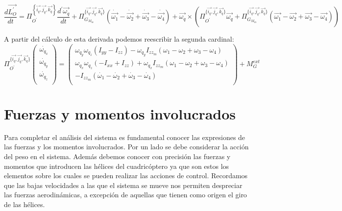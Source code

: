 \documentclass[main]{subfiles}
\begin{document}
{\footnotesize \begin{equation}
\frac{d\vec{L_O^\prime}}{dt}=\Pi_{O^\prime}^{\left\lbrace\vec{i_q}, \vec{j_q}, \vec{k_q}\right\rbrace}\frac{d^\prime\vec{{\omega}_q}}{dt}+\Pi_{G_{M_{m}}}^{\{\vec{i_q}, \vec{j_q}, \vec{k_q}\}}(\dot{\vec{\omega_1}}-\dot{\vec{\omega_2}}+\dot{\vec{\omega_3}}-\dot{\vec{\omega_4}})
+\vec{\omega_q}\times(\Pi_{O^\prime}^{\{\vec{i_q}, \vec{j_q}, \vec{k_q}\}}\vec{\omega_q}+\Pi_{G_{M_{m}}}^{\{\vec{i_q}, \vec{j_q}, \vec{k_q}\}}(\vec{\omega_1}-\vec{\omega_2}+\vec{\omega_3}-\vec{\omega_4}))
\end{equation}}

A partir del c\'alculo de esta derivada podemos reescribir la segunda cardinal:
\begin{equation}
 \Pi_{O^\prime}^{\{\vec{i_q}, \vec{j_q}, \vec{k_q}\}}\left(\begin{array}{c}
\dot{\omega_{q_x}}\\
\dot{\omega_{q_y}}\\
\dot{\omega_{q_z}}\\
\end{array}\right) = \left(\begin{array}{c}
\omega_{q_y}\omega_{q_z}(I_{yy}-I_{zz})-\omega_{q_y}I_{zz_m}(\omega_1-\omega_2+\omega_3-\omega_4)\\

\omega_{q_x}\omega_{q_z}(-I_{xx}+I_{zz})+\omega_{q_x}I_{zz_m}(\omega_1-\omega_2+\omega_3-\omega_4)\\

-I_{zz_m}(\dot{\omega_1}-\dot{\omega_2}+\dot{\omega_3}-\dot{\omega_4})\\

\end{array}\right) + M_G^{ext}
\label{eq:omegas}
\end{equation}

\section{Fuerzas y momentos involucrados}
\label{FYT}

Para completar el an\'alisis del sistema es fundamental conocer las expresiones de las fuerzas y los momentos involucrados. Por un lado se debe considerar la acci\'on del peso en el sistema. Adem\'as debemos conocer con precisi\'on las fuerzas y momentos que introducen las h\'elices del cuadric\'optero ya que son estos los elementos sobre los cuales se pueden realizar las acciones de control. Recordamos que las bajas velocidades a las que el sistema se mueve nos permiten despreciar las fuerzas aerodin\'amicas, a excepci\'on de aquellas que tienen como origen el giro de las h\'elices.
\end{document}
